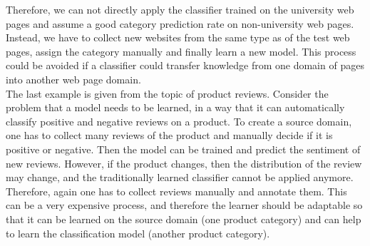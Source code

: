 Therefore, we can not directly apply the classifier trained on the university web pages and assume a good category prediction rate on non-university web pages.
Instead, we have to collect new websites from the same type as of the test web pages, assign the category manually and finally learn a new model.
This process could be avoided if a classifier could transfer knowledge from one domain of pages into another web page domain.\cite{Pan.2010}\\
The last example is given from the topic of product reviews.
Consider the problem that a model needs to be learned, in a way that it can automatically classify positive and negative reviews on a product.
To create a source domain, one has to collect many reviews of the product and manually decide if it is positive or negative.
Then the model can be trained and predict the sentiment of new reviews.
However, if the product changes, then the distribution of the review may change, and the traditionally learned classifier cannot be applied anymore.
Therefore, again one has to collect reviews manually and annotate them.
This can be a very expensive process, and therefore the learner should be adaptable so that it can be learned on the source domain (one product category) and can help to learn the classification model (another product category).\cite{Pan.2010}


